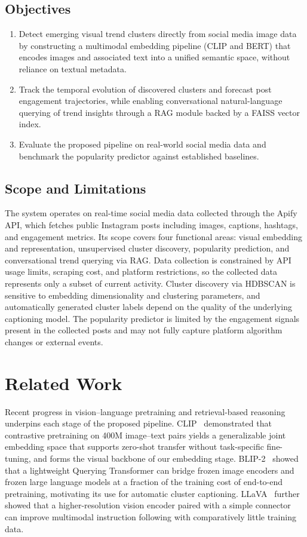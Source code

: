 \documentclass[conference]{IEEEtran}
\begin{document}
\subsection{Objectives}
\begin{enumerate}
    \item Detect emerging visual trend clusters directly from social media image data by constructing a multimodal embedding pipeline (CLIP and BERT) that encodes images and associated text into a unified semantic space, without reliance on textual metadata.
    \item Track the temporal evolution of discovered clusters and forecast post engagement trajectories, while enabling conversational natural-language querying of trend insights through a RAG module backed by a FAISS vector index.
    \item Evaluate the proposed pipeline on real-world social media data and benchmark the popularity predictor against established baselines.
\end{enumerate}

\subsection{Scope and Limitations}
The system operates on real-time social media data collected through the Apify API, which fetches public Instagram posts including images, captions, hashtags, and engagement metrics. Its scope covers four functional areas: visual embedding and representation, unsupervised cluster discovery, popularity prediction, and conversational trend querying via RAG. Data collection is constrained by API usage limits, scraping cost, and platform restrictions, so the collected data represents only a subset of current activity. Cluster discovery via HDBSCAN is sensitive to embedding dimensionality and clustering parameters, and automatically generated cluster labels depend on the quality of the underlying captioning model. The popularity predictor is limited by the engagement signals present in the collected posts and may not fully capture platform algorithm changes or external events.

\section{Related Work}

Recent progress in vision--language pretraining and retrieval-based reasoning underpins each stage of the proposed pipeline. CLIP~\cite{clip} demonstrated that contrastive pretraining on 400M image--text pairs yields a generalizable joint embedding space that supports zero-shot transfer without task-specific fine-tuning, and forms the visual backbone of our embedding stage. BLIP-2~\cite{blip2} showed that a lightweight Querying Transformer can bridge frozen image encoders and frozen large language models at a fraction of the training cost of end-to-end pretraining, motivating its use for automatic cluster captioning. LLaVA~\cite{llava} further showed that a higher-resolution vision encoder paired with a simple connector can improve multimodal instruction following with comparatively little training data.
\end{document}

